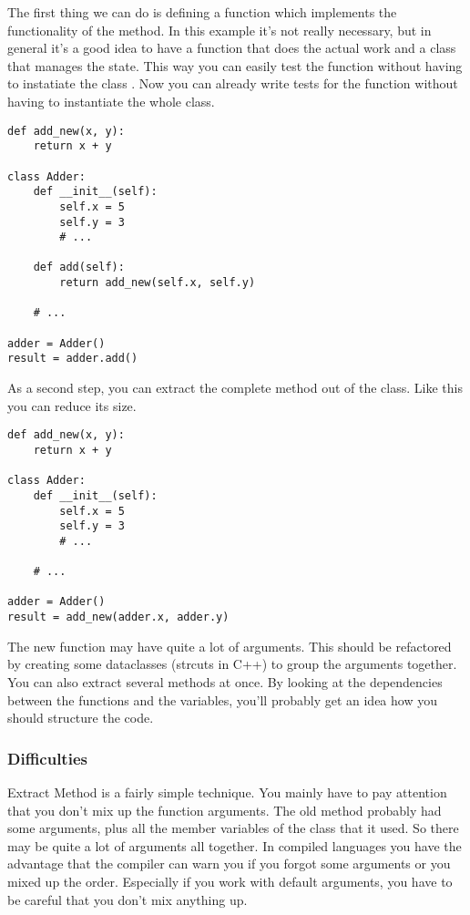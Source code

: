 The first thing we can do is defining a function  which implements the functionality of the  method. In this example it's not really necessary, but in general it's a good idea to have a function that does the actual work and a class that manages the state. This way you can easily test the function  without having to instatiate the class . Now you can already write tests for the function without having to instantiate the whole class.

\begin{programcode}{}
\begin{verbatim}
def add_new(x, y):
    return x + y

class Adder:
    def __init__(self):
        self.x = 5
        self.y = 3
        # ...

    def add(self):
        return add_new(self.x, self.y)
    
    # ...

adder = Adder()
result = adder.add()
\end{verbatim}
\end{programcode}

As a second step, you can extract the complete method out of the class. Like this you can reduce its size.

\begin{programcode}{}
\begin{verbatim}
def add_new(x, y):
    return x + y

class Adder:
    def __init__(self):
        self.x = 5
        self.y = 3
        # ...
    
    # ...

adder = Adder()
result = add_new(adder.x, adder.y)
\end{verbatim}
\end{programcode}

The new function may have quite a lot of arguments. This should be refactored by creating some dataclasses (strcuts in C++) to group the arguments together. You can also extract several methods at once. By looking at the dependencies between the functions and the variables, you'll probably get an idea how you should structure the code.

\subsubsection*{Difficulties}

Extract Method is a fairly simple technique. You mainly have to pay attention that you don't mix up the function arguments. The old method probably had some arguments, plus all the member variables of the class that it used. So there may be quite a lot of arguments all together. In compiled languages you have the advantage that the compiler can warn you if you forgot some arguments or you mixed up the order. Especially if you work with default arguments, you have to be careful that you don't mix anything up.



